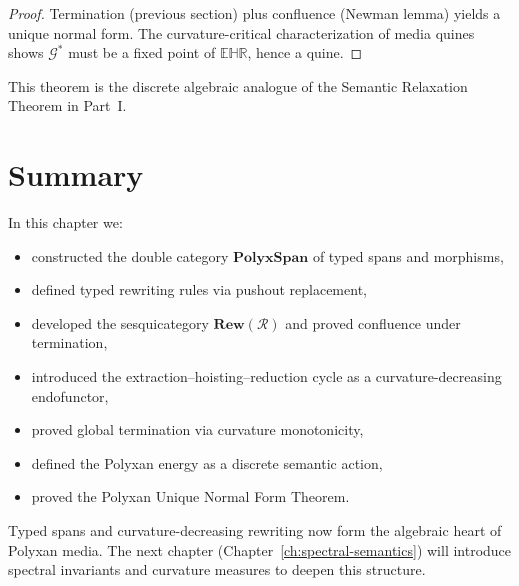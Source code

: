 \begin{proof}
Termination (previous section) plus confluence (Newman lemma) yields a unique
normal form.  The curvature-critical characterization of media quines shows
$\mathcal{G}^\ast$ must be a fixed point of $\mathbb{EHR}$, hence a quine.
\end{proof}

This theorem is the discrete algebraic analogue of the Semantic Relaxation
Theorem in Part~I.

\section{Summary}

In this chapter we:
\begin{itemize}
\item constructed the double category $\mathbf{PolyxSpan}$ of typed spans and morphisms,
\item defined typed rewriting rules via pushout replacement,
\item developed the sesquicategory $\mathbf{Rew}(\mathcal{R})$ and proved confluence under termination,
\item introduced the extraction–hoisting–reduction cycle as a curvature-decreasing endofunctor,
\item proved global termination via curvature monotonicity,
\item defined the Polyxan energy as a discrete semantic action,
\item proved the Polyxan Unique Normal Form Theorem.
\end{itemize}

Typed spans and curvature-decreasing rewriting now form the algebraic heart
of Polyxan media.  The next chapter (Chapter~\ref{ch:spectral-semantics})
will introduce spectral invariants and curvature measures to deepen this structure.
